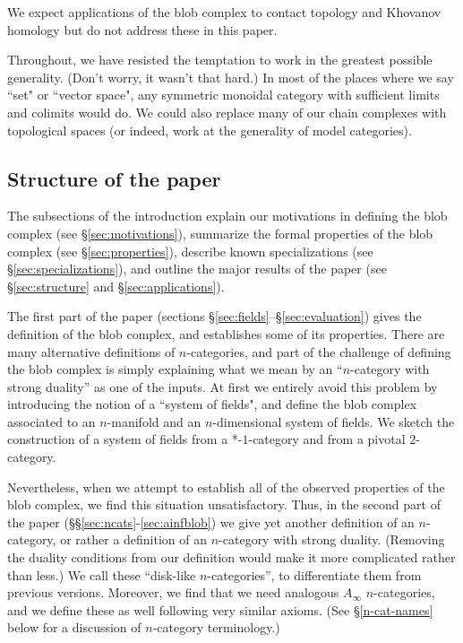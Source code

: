 We expect applications of the blob complex to contact topology and Khovanov homology 
but do not address these in this paper.

Throughout, we have resisted the temptation to work in the greatest possible generality.
(Don't worry, it wasn't that hard.)
In most of the places where we say ``set" or ``vector space", any symmetric monoidal category 
with sufficient limits and colimits would do.
We could also replace many of our chain complexes with topological spaces (or indeed, work at the generality of model categories).


\subsection{Structure of the paper}
The subsections of the introduction explain our motivations in defining the blob complex (see \S \ref{sec:motivations}), 
summarize the formal properties of the blob complex (see \S \ref{sec:properties}), describe known specializations (see \S \ref{sec:specializations}), and outline the major results of the paper (see \S \ref{sec:structure} and \S \ref{sec:applications}).

The first part of the paper (sections \S \ref{sec:fields}--\S \ref{sec:evaluation}) gives the definition of the blob complex, 
and establishes some of its properties.
There are many alternative definitions of $n$-categories, and part of the challenge of defining the blob complex is 
simply explaining what we mean by an ``$n$-category with strong duality'' as one of the inputs.
At first we entirely avoid this problem by introducing the notion of a ``system of fields", and define the blob complex 
associated to an $n$-manifold and an $n$-dimensional system of fields.
We sketch the construction of a system of fields from a *-$1$-category and from a pivotal $2$-category.

Nevertheless, when we attempt to establish all of the observed properties of the blob complex, 
we find this situation unsatisfactory.
Thus, in the second part of the paper (\S\S \ref{sec:ncats}-\ref{sec:ainfblob}) we give yet another 
definition of an $n$-category, or rather a definition of an $n$-category with strong duality.
(Removing the duality conditions from our definition would make it more complicated rather than less.) 
We call these ``disk-like $n$-categories'', to differentiate them from previous versions.
Moreover, we find that we need analogous $A_\infty$ $n$-categories, and we define these as well following very similar axioms.
(See \S \ref{n-cat-names} below for a discussion of $n$-category terminology.)

